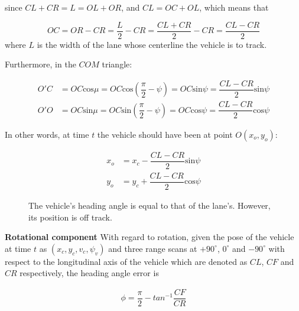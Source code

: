 \documentclass[oneside,12pt]{article}
\begin{document}
    since $CL + CR = L = OL + OR$, and $CL = OC + OL$, which means that

    \begin{equation}
      OC = OR - CR = \dfrac{L}{2} - CR = \dfrac{CL + CR}{2} - CR = \dfrac{CL-CR}{2}
    \end{equation}
    where $L$ is the width of the lane whose centerline the vehicle is to track.

    Furthermore, in the $COM$ triangle:

    \begin{align}
      O'C &= OC \text{cos}\mu = OC \text{cos}(\dfrac{\pi}{2} - \psi) = OC \text{sin}\psi = \dfrac{CL-CR}{2} \text{sin}\psi\\
      O'O &= OC \text{sin}\mu = OC \text{sin}(\dfrac{\pi}{2} - \psi) = OC \text{cos}\psi = \dfrac{CL-CR}{2} \text{cos}\psi
    \end{align}

    In other words, at time $t$ the vehicle should have been at point $O(x_o, y_o)$:

    \begin{align}
      x_o &=x_c - \dfrac{CL-CR}{2}\text{sin}\psi \\
      y_o &=y_c + \dfrac{CL-CR}{2}\text{cos}\psi
    \end{align}

    \begin{figure}[H]\centering
      \scalebox{1}{}
      \caption{The vehicle's heading angle is equal to that of the lane's.
        However, its position is off track.}
      \label{}
    \end{figure}

    \begin{figure}[H]\centering
      \scalebox{1}{}
      \caption{}
      \label{}
    \end{figure}

    \textbf{Rotational component} With regard to rotation, given the pose of
    the vehicle at time $t$ as $(x_c, y_c, v_c, \psi_v)$ and three range scans
    at $+90^\circ$, $0^\circ$ and $-90^\circ$ with respect to the longitudinal
    axis of the vehicle which are denoted as $CL$, $CF$ and $CR$ respectively,
    the heading angle error is

    \begin{align}
      \phi = \dfrac{\pi}{2} - tan^{-1}\dfrac{CF}{CR}
    \end{align}
\end{document}
